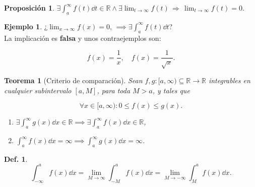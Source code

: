 \documentclass{article}
\theoremstyle{definicion}
\newtheorem{definicion}{Def.}
\theoremstyle{definition}             %
\theoremstyle{definition}             %
\theoremstyle{definition}
\theoremstyle{definition}
\theoremstyle{observacion}
\theoremstyle{definition}
\newtheorem{prop}{Proposición}
\theoremstyle{plain}
\newtheorem{theorem}{Teorema}
\theoremstyle{definition}
\newtheorem{exe}{Ejemplo}
\theoremstyle{afirmacion}
\theoremstyle{definition}
\begin{document}
    \begin{prop}
        \(\exists \int_{a}^{\infty}f(t)\dd{t}\in\mathbb{R} \wedge \exists \lim_{t\to\infty}f(t)\, \Rightarrow\, \lim_{t \to \infty} f(t) = 0\).
    \end{prop}

    \begin{exe}
        ¿\(\lim_{x\to\infty}f(x) = 0,\, \implies \exists \int_{a}^{\infty}f(t)\dd{t}\)?\\
        La implicación es \textbf{falsa} y unos contraejemplos son:

        \begin{equation*}
            f(x) = \dfrac{1}{x},\quad f(x) = \dfrac{1}{\sqrt{x}}.
        \end{equation*}
    \end{exe}

    \begin{theorem}[Criterio de comparación]
        Sean \(f,g \colon [a,\infty)\subseteq \mathbb{R} \to \mathbb{R}\) integrables en cualquier subintervalo \([a,M]\), para toda \(M > a\), y tales que 

        \begin{equation*}
            \forall x\in [a,\infty)\colon 0 \leq f(x) \leq g(x).
        \end{equation*}

        \begin{enumerate}
            \item \(\exists \int_{a}^{\infty}g(x)\dd{x}\in\mathbb{R} \implies \exists \int_{a}^{\infty}f(x)\dd{x}\in\mathbb{R}\),
            \item \(\int_{a}^{\infty}f(x)\dd{x} = \infty \implies \int_{a}^{\infty}g(x)\dd{x} = \infty\).
        \end{enumerate}
    \end{theorem}

    \begin{definicion}
        \vphantom{afjdhgsjlfalhjdfkajfjhfdajsd}
        \begin{equation*}
            \int_{-\infty}^{a}f(x)\dd{x} = \lim_{M\to\infty}\int_{-M}^{a}f(x)\dd{x} = \lim_{M\to - \infty}\int_{M}^{a}f(x)\dd{x}.
        \end{equation*}
    \end{definicion}
\end{document}
